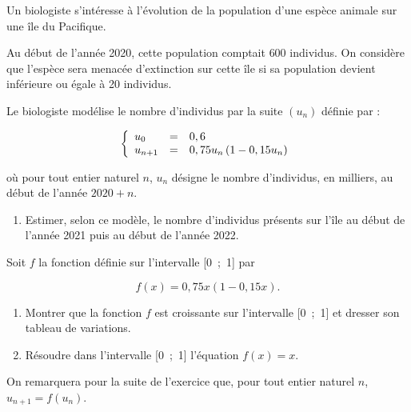  
\medskip


Un biologiste s'intéresse à l'évolution de la population d'une espèce animale sur une île du Pacifique.

Au début de l'année 2020, cette population comptait $600$ individus. On considère que l'espèce sera menacée d'extinction sur cette île si sa population devient inférieure ou égale à 20 individus.

\smallskip

Le biologiste modélise le nombre d'individus par la suite $\left(u_n\right)$ définie par : 

\[\left\{\begin{array}{l c l}
u_0		&=	&0,6\\
u_{n+1}	&=	&0,75 u_n\left(1 - 0,15 u_n\right)
\end{array}\right.\]

où pour tout entier naturel $n$, $u_n$ désigne le nombre d'individus, en milliers, au début de l'année $2020 + n$.

\medskip

\begin{enumerate}
\item Estimer, selon ce modèle, le nombre d'individus présents sur l'île au début de l'année 2021 puis au début de l'année 2022.
\end{enumerate}

Soit $f$ la fonction définie sur l'intervalle [0~;~1] par 

\[f(x) = 0,75x (1 - 0,15x).\]

\begin{enumerate}[resume]
\item Montrer que la fonction $f$ est croissante sur l'intervalle [0~;~1] et dresser son tableau de variations.
\item Résoudre dans l'intervalle [0~;~1] l'équation $f(x) = x$.
\end{enumerate}

On remarquera pour la suite de l'exercice que, pour tout entier naturel $n$,\, $u_{n+1} = f\left(u_n\right)$.

